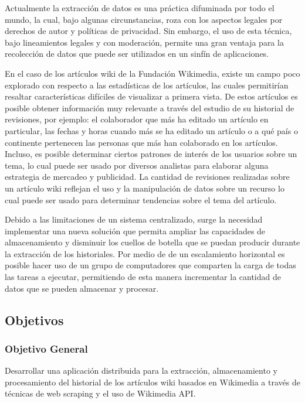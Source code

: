 Actualmente la extracción de datos es una práctica difuminada por todo el mundo, la
cual, bajo algunas circunstancias, roza con los aspectos legales por derechos de autor y
políticas de privacidad. Sin embargo, el uso de esta técnica, bajo lineamientos legales y con
moderación, permite una gran ventaja para la recolección de datos que puede ser
utilizados en un sinfín de aplicaciones.

En el caso de los artículos wiki de la Fundación Wikimedia, existe un campo poco
explorado con respecto a las estadísticas de los artículos, las cuales permitirían resaltar
características difíciles de visualizar a primera vista. De estos artículos es posible
obtener información muy relevante a través del estudio de su historial de revisiones, por ejemplo:
el colaborador que más ha editado un artículo en particular, las fechas y
horas cuando más se ha editado un artículo o a qué país o continente pertenecen las
personas que más han colaborado en los artículos. Incluso, es posible determinar ciertos
patrones de interés de los usuarios sobre un tema, lo cual puede ser usado por diversos
analistas para elaborar alguna estrategia de mercadeo y publicidad. La cantidad de
revisiones realizadas sobre un artículo wiki reflejan el uso y la manipulación de datos
sobre un recurso lo cual puede ser usado para determinar tendencias sobre el tema del
artículo.

Debido a las limitaciones de un sistema centralizado, surge la necesidad implementar una nueva solución
que permita ampliar las capacidades de almacenamiento y disminuir los cuellos de botella que se puedan
producir durante la extracción de los historiales. Por medio de de un escalamiento horizontal
es posible hacer uso de un grupo de computadores que comparten la carga de todas las tareas a ejecutar,
permitiendo de esta manera incrementar la cantidad de datos que se pueden almacenar y procesar.

\subsection{Objetivos}

\subsubsection{Objetivo General}

Desarrollar una aplicación distribuida para la extracción, almacenamiento y
procesamiento del historial de los artículos wiki basados en Wikimedia a través de
técnicas de web scraping y el uso de Wikimedia API.

